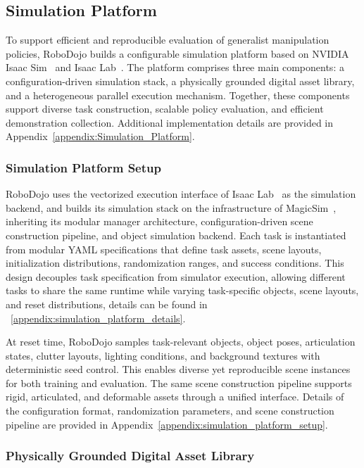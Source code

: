 \subsection{Simulation Platform}
\label{sec:simulation_platform}

To support efficient and reproducible evaluation of generalist manipulation policies, RoboDojo builds a configurable simulation platform based on NVIDIA Isaac Sim~\citep{NVIDIA_Isaac_Sim} and Isaac Lab~\citep{mittal2025isaaclab}. The platform comprises three main components: a configuration-driven simulation stack, a physically grounded digital asset library, and a heterogeneous parallel execution mechanism. Together, these components support diverse task construction, scalable policy evaluation, and efficient demonstration collection. Additional implementation details are provided in Appendix~\ref{appendix:Simulation_Platform}.

\subsubsection{Simulation Platform Setup}

RoboDojo uses the vectorized execution interface of Isaac Lab~\citep{mittal2025isaaclab} as the simulation backend, and builds its simulation stack on the infrastructure of MagicSim~\citep{lu2026magicsim}, inheriting its modular manager architecture, configuration-driven scene construction pipeline, and object simulation backend. Each task is instantiated from modular YAML specifications that define task assets, scene layouts, initialization distributions, randomization ranges, and success conditions. This design decouples task specification from simulator execution, allowing different tasks to share the same runtime while varying task-specific objects, scene layouts, and reset distributions, details can be found in ~\ref{appendix:simulation_platform_details}.

At reset time, RoboDojo samples task-relevant objects, object poses, articulation states, clutter layouts, lighting conditions, and background textures with deterministic seed control. This enables diverse yet reproducible scene instances for both training and evaluation. The same scene construction pipeline supports rigid, articulated, and deformable assets through a unified interface. Details of the configuration format, randomization parameters, and scene construction pipeline are provided in Appendix~\ref{appendix:simulation_platform_setup}.

\subsubsection{Physically Grounded Digital Asset Library}

